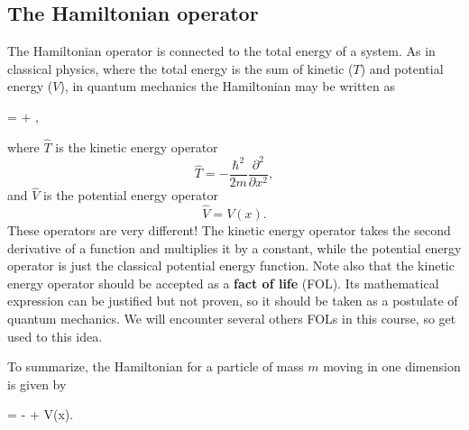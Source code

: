 \documentclass[../Main/chem331-notes.tex]{subfiles}
\begin{document}
\subsection{The Hamiltonian operator}
The Hamiltonian operator is connected to the total energy of a system.
As in classical physics, where the total energy is the sum of kinetic ($T$) and potential energy ($V$), in quantum mechanics the Hamiltonian may be written as
\begin{iequation}
 =  + ,
\end{iequation}
where $\hat{T}$ is the kinetic energy operator
\begin{equation}
\hat{T} = - \frac{\hbar^2}{2 m} \frac{\partial^2}{\partial x^2},
\end{equation}
and $\hat{V}$ is the potential energy operator
\begin{equation}
\hat{V} = V(x).
\end{equation}
These operators are very different!
The kinetic energy operator takes the second derivative of a function and multiplies it by a constant, while the potential energy operator is just the classical potential energy function.
Note also that the kinetic energy operator should be accepted as a \textbf{fact of life} (FOL).
Its mathematical expression can be justified but not proven, so it should be taken as a postulate of quantum mechanics.
We will encounter several others FOLs in this course, so get used to this idea.

To summarize, the Hamiltonian for a particle of mass $m$ moving in one dimension is given by
\begin{iequation}
 =  -   + V(x).
\end{iequation}
\end{document}
